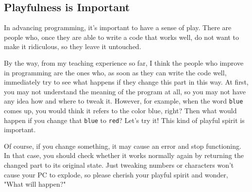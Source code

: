 \documentclass{ltjsbook}
\begin{document}
\subsection{Playfulness is Important}
In advancing programming, it's important to have a sense of play. There are people who, once they are able to write a code that works well, do not want to make it ridiculous, so they leave it untouched.

By the way, from my teaching experience so far, I think the people who improve in programming are the ones who, as soon as they can write the code well, immediately try to see what happens if they change this part in this way. At first, you may not understand the meaning of the program at all, so you may not have any idea how and where to tweak it. However, for example, when the word \texttt{blue} comes up, you would think it refers to the color blue, right? Then what would happen if you change that \texttt{blue} to \texttt{red}? Let's try it! This kind of playful spirit is important.

Of course, if you change something, it may cause an error and stop functioning. In that case, you should check whether it works normally again by returning the changed part to its original state. Just tweaking numbers or characters won't cause your PC to explode, so please cherish your playful spirit and wonder, "What will happen?"

\end{document}
